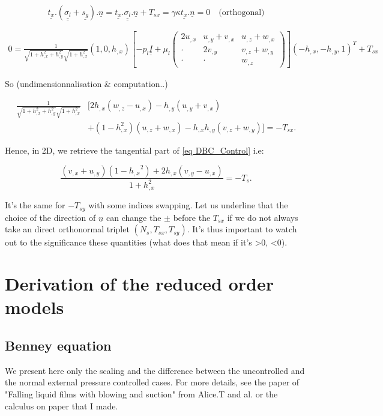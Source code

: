 \documentclass[12pt]{article}
\begin{document}
$$\underline{t_x}.(\underline{\underline{\sigma_l}}+\underline{s_g}).\underline{n}= \underline{t_x}.\underline{\underline{\sigma_l}}.\underline{n}+T_{sx}=\gamma\kappa\underline{t_x}.\underline{n}=0 \quad \text{(orthogonal)}$$

\begin{align*}
0 = \frac{1}{\sqrt{1+h_{,x}^2+h_{,y}^2}\sqrt{1+h_{,x}^2}}(1, 0, h_{,x})\left[ -p_l\underline{\underline{I}} + \mu_l\begin{pmatrix}
2u_{,x} & u_{,y}+v_{,x} & u_{,z}+w_{,x} \\
\cdot & 2v_{,y} & v_{,z}+w_{,y} \\
\cdot & \cdot & w_{,z}
\end{pmatrix} \right](-h_{,x}, -h_{,y}, 1)^T+T_{sx}
\end{align*}

So (undimensionnalisation \& computation..)


\begin{align*}
    \frac{1}{\sqrt{1+h_{,x}^2+h_{,y}^2}\sqrt{1+h_{,x}^2}} &\Big[
        2h_{,x}(w_{,z}-u_{,x})-h_{,y}(u_{,y}+v_{,x})\\
    &+(1-h_{,x}^2)(u_{,z}+w_{,x}) -h_{,x}h_{,y}(v_{,z}+w_{,y}) \Big]
    = -T_{sx}.
\end{align*}


Hence, in 2D, we retrieve the tangential part of \eqref{eq DBC_Control} i.e: 

$$    \frac{(v_{,x} + u_{,y})(1-{h_{,x}}^2)+2h_{,x}(v_{,y}-u_{,x})}{1+h_{,x}^2}= -T_s. $$

It's the same for $-T_{sy}$ with some indices swapping. Let us underline that the choice of the direction of $\underline{n}$ can change the $\pm$ before the $T_{sx}$ if we do not always take an direct orthonormal triplet $(N_s, T_{sx}, T_{sy})$. It's thus important to watch out to the significance these quantities (what does that mean if it's >0, <0). 

\section{Derivation of the reduced order models}
\subsection{Benney equation}
We present here only the scaling and the difference between the uncontrolled and the normal external pressure controlled cases. For more details, see the paper of "Falling liquid films with blowing and suction" from Alice.T and al. or the calculus on paper that I made. 
\end{document}
